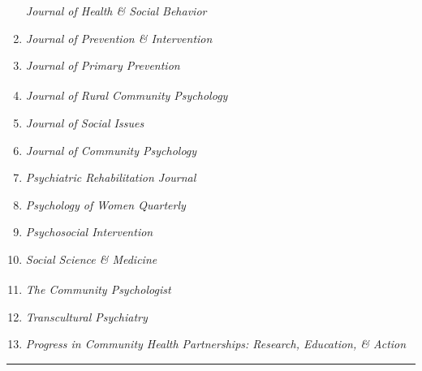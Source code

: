 \documentclass[]{tufte-handout}
\begin{document}
\begin{enumerate}
  \emph{Journal of Health \& Social Behavior}
\item
  \emph{Journal of Prevention \& Intervention}
\item
  \emph{Journal of Primary Prevention}
\item
  \emph{Journal of Rural Community
  Psychology\textsuperscript{\textdagger}}
\item
  \emph{Journal of Social Issues}
\item
  \emph{Journal of Community Psychology}
\item
  \emph{Psychiatric Rehabilitation Journal}
\item
  \emph{Psychology of Women Quarterly}
\item
  \emph{Psychosocial Intervention}
\item
  \emph{Social Science \& Medicine}
\item
  \emph{The Community Psychologist\textsuperscript{\textdaggerdbl}}
\item
  \emph{Transcultural Psychiatry}
\item
  \emph{Progress in Community Health Partnerships: Research, Education,
  \& Action}
\end{enumerate}


\begin{center}\rule{0.5\linewidth}{\linethickness}\end{center}
\end{document}
